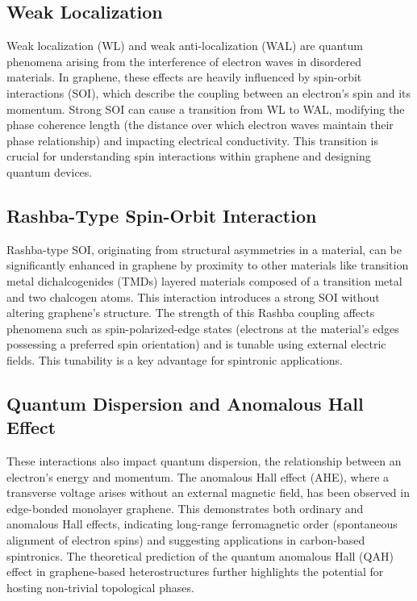 \documentclass[twocolumn]{revtex4-2}
\begin{document}
    \subsection{Weak Localization}\label{subsec:weak-localization}

        Weak localization (WL) and weak anti-localization (WAL) are quantum phenomena arising from the interference of electron waves in disordered materials.
         In graphene, these effects are heavily influenced by spin-orbit interactions (SOI), which describe the coupling between an electron's spin and its momentum.
          Strong SOI can cause a transition from WL to WAL, modifying the phase coherence length (the distance over which electron waves maintain their phase relationship) and impacting electrical conductivity\cite{WeizheMaterials2017,AvsarNatCommun2014}.
           This transition is crucial for understanding spin interactions within graphene and designing quantum devices.

    \subsection{Rashba-Type Spin-Orbit Interaction}\label{subsec:rashba-type-spin-orbit-interaction}

    Rashba-type SOI, originating from structural asymmetries in a material, can be significantly enhanced in graphene by proximity to other materials like transition metal dichalcogenides (TMDs) layered materials composed of a transition metal and two chalcogen atoms.
     This interaction introduces a strong SOI without altering graphene's structure\cite{WangPhysRevX2016, AvsarNatCommun2014}.
      The strength of this Rashba coupling affects phenomena such as spin-polarized-edge states (electrons at the material's edges possessing a preferred spin orientation) and is tunable using external electric fields.
      This tunability is a key advantage for spintronic applications.

    \subsection{Quantum Dispersion and Anomalous Hall Effect}\label{subsec:quantum-dispersion-and-anomalous-hall-effect}

    These interactions also impact quantum dispersion, the relationship between an electron's energy and momentum.
    The anomalous Hall effect (AHE), where a transverse voltage arises without an external magnetic field, has been observed in edge-bonded monolayer graphene\cite{LiuNano2023}.
     This demonstrates both ordinary and anomalous Hall effects, indicating long-range ferromagnetic order (spontaneous alignment of electron spins) and suggesting applications in carbon-based spintronics\cite{YaoMater2024}.
      The theoretical prediction of the quantum anomalous Hall (QAH) effect in graphene-based heterostructures further highlights the potential for hosting non-trivial topological phases.
\end{document}
